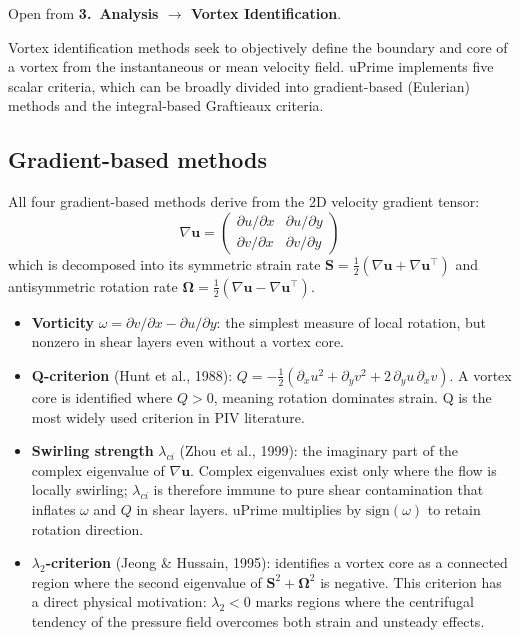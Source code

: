 \documentclass[11pt, a4paper]{report}
\newcommand{\uipth}[1]{\textbf{\textcolor{upblue}{#1}}}
\newcommand{\software}[1]{\textsf{#1}}
\begin{document}
Open from \uipth{3.\ Analysis $\to$ Vortex Identification}.

Vortex identification methods seek to objectively define the boundary and core of a vortex from the instantaneous or mean velocity field. \software{uPrime} implements five scalar criteria, which can be broadly divided into gradient-based (Eulerian) methods and the integral-based Graftieaux criteria.

\subsection*{Gradient-based methods}

All four gradient-based methods derive from the 2D velocity gradient tensor:
\[
\nabla \mathbf{u} = \begin{pmatrix} \partial u/\partial x & \partial u/\partial y \\ \partial v/\partial x & \partial v/\partial y \end{pmatrix}
\]
which is decomposed into its symmetric strain rate $\mathbf{S} = \tfrac{1}{2}(\nabla\mathbf{u} + \nabla\mathbf{u}^\top)$ and antisymmetric rotation rate $\boldsymbol{\Omega} = \tfrac{1}{2}(\nabla\mathbf{u} - \nabla\mathbf{u}^\top)$.

\begin{itemize}[leftmargin=1.5em]
  \item \textbf{Vorticity} $\omega = \partial v/\partial x - \partial u/\partial y$: the simplest measure of local rotation, but nonzero in shear layers even without a vortex core.

  \item \textbf{Q-criterion} (Hunt et al., 1988): $Q = -\tfrac{1}{2}(\partial_x u^2 + \partial_y v^2 + 2\,\partial_y u\,\partial_x v)$. A vortex core is identified where $Q > 0$, meaning rotation dominates strain. Q is the most widely used criterion in PIV literature.

  \item \textbf{Swirling strength} $\lambda_{ci}$ (Zhou et al., 1999): the imaginary part of the complex eigenvalue of $\nabla\mathbf{u}$. Complex eigenvalues exist only where the flow is locally swirling; $\lambda_{ci}$ is therefore immune to pure shear contamination that inflates $\omega$ and $Q$ in shear layers. \software{uPrime} multiplies by $\text{sign}(\omega)$ to retain rotation direction.

  \item \textbf{$\lambda_2$-criterion} (Jeong \& Hussain, 1995): identifies a vortex core as a connected region where the second eigenvalue of $\mathbf{S}^2 + \boldsymbol{\Omega}^2$ is negative. This criterion has a direct physical motivation: $\lambda_2 < 0$ marks regions where the centrifugal tendency of the pressure field overcomes both strain and unsteady effects.
\end{itemize}
\end{document}
